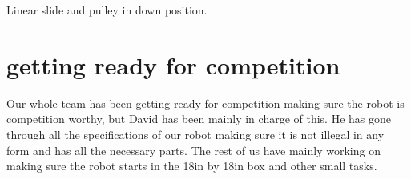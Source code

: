 Linear slide and pulley in down position.

\section*{getting ready for competition}
Our whole team has been getting ready for competition making sure the robot is competition worthy, but David has been mainly in charge of this. He has gone through all the specifications of our robot making sure it is not illegal in any form and has all the necessary parts. The rest of us have mainly working on making sure the robot starts in the 18in by 18in box and other small tasks.